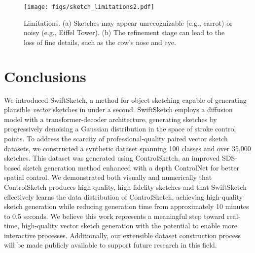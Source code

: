 \begin{figure}[h]
    \centering
    \texttt{[image: figs/sketch\_limitations2.pdf]}\vspace{-0.45cm}
    \caption{Limitations. (a) Sketches may appear unrecognizable (e.g., carrot) or noisy (e.g., Eiffel Tower). (b) The refinement stage can lead to the loss of fine details, such as the cow's nose and eye.}
    \label{fig:limitations}
\end{figure}





\section{Conclusions}
We introduced SwiftSketch, a method for object sketching capable of generating plausible \emph{vector} sketches in under a second. SwiftSketch employs a diffusion model with a transformer-decoder architecture, generating sketches by progressively denoising a Gaussian distribution in the space of stroke control points.
To address the scarcity of professional-quality paired vector sketch datasets, we constructed a synthetic dataset spanning 100 classes and over 35,000 sketches. This dataset was generated using ControlSketch, an improved SDS-based sketch generation method enhanced with a depth ControlNet for better spatial control. We demonstrated both visually and numerically that ControlSketch produces high-quality, high-fidelity sketches and that SwiftSketch effectively learns the data distribution of ControlSketch, achieving high-quality sketch generation while reducing generation time from approximately 10 minutes to 0.5 seconds.
We believe this work represents a meaningful step toward real-time, high-quality vector sketch generation with the potential to enable more interactive processes. Additionally, our extensible dataset construction process will be made publicly available to support future research in this field.


